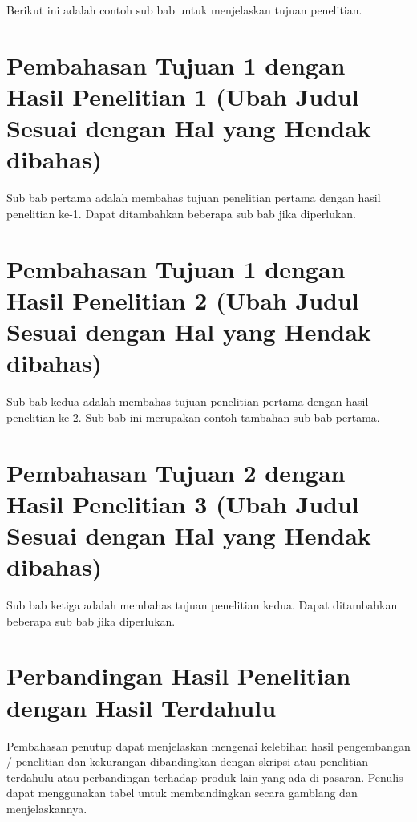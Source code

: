 Berikut ini adalah contoh sub bab untuk menjelaskan tujuan penelitian.

\section{Pembahasan Tujuan 1 dengan Hasil Penelitian 1 (Ubah Judul Sesuai dengan Hal yang Hendak dibahas)}

Sub bab pertama adalah membahas tujuan penelitian pertama dengan hasil penelitian ke-1. 
Dapat ditambahkan beberapa sub bab jika diperlukan.

\section{Pembahasan Tujuan 1 dengan Hasil Penelitian 2 (Ubah Judul Sesuai dengan Hal yang Hendak dibahas)}

Sub bab kedua adalah membahas tujuan penelitian pertama dengan hasil penelitian ke-2. Sub bab ini merupakan contoh tambahan sub bab pertama.

\section{Pembahasan Tujuan 2 dengan Hasil Penelitian 3 (Ubah Judul Sesuai dengan Hal yang Hendak dibahas)}

Sub bab ketiga adalah membahas tujuan penelitian kedua. Dapat ditambahkan beberapa sub bab jika diperlukan.

\section{Perbandingan Hasil Penelitian dengan Hasil Terdahulu}

Pembahasan penutup dapat menjelaskan mengenai kelebihan hasil pengembangan / 
penelitian dan kekurangan dibandingkan dengan skripsi atau penelitian terdahulu atau
perbandingan terhadap produk lain yang ada di pasaran. Penulis dapat menggunakan tabel untuk membandingkan secara gamblang dan menjelaskannya.